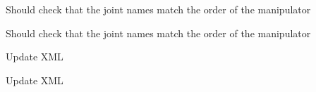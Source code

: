 
\begin{DoxyRefList}
\item[Member \mbox{\hyperlink{namespacetesseract__planning_a5479a76ec33cda8924d0e54d336e5ccc}{tesseract\+\_\+planning\+::Default\+Descartes\+Problem\+Generator}} (const std\+::string \&name, const \mbox{\hyperlink{structtesseract__planning_1_1PlannerRequest}{Planner\+Request}} \&request, const Descartes\+Plan\+Profile\+Map$<$ Float\+Type $>$ \&plan\+\_\+profiles)]\label{todo__todo000006}%
%
Should check that the joint names match the order of the manipulator 

\label{todo__todo000005}%
%
Should check that the joint names match the order of the manipulator  
\item[Member \mbox{\hyperlink{classtesseract__planning_1_1DescartesDefaultPlanProfile_a8bbf9dd170dfc5da44f4117d74ca7a6a}{tesseract\+\_\+planning\+::Descartes\+Default\+Plan\+Profile$<$ Float\+Type $>$\+::Descartes\+Default\+Plan\+Profile}} (const tinyxml2\+::\+XMLElement \&xml\+\_\+element)]\label{todo__todo000001}%
%
Update XML 

\label{todo__todo000003}%
%
Update XML 


\end{DoxyRefList}
